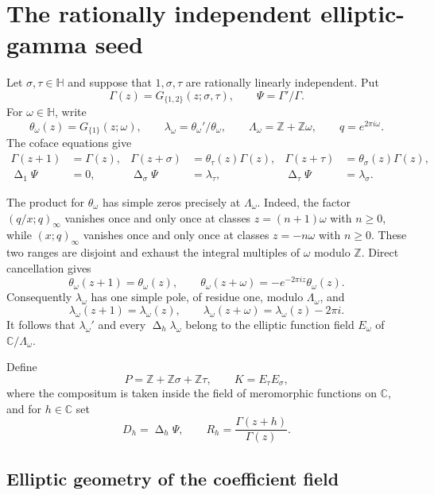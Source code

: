 \documentclass[11pt]{article}
\numberwithin{equation}{section}
\theoremstyle{definition}
\theoremstyle{remark}
\newcommand{\C}{\mathbb C}
\newcommand{\Z}{\mathbb Z}
\newcommand{\HH}{\mathbb H}
\newcommand{\Deltaop}{\mathop{\Delta}}
\begin{document}
\section{The rationally independent elliptic-gamma seed}
\label{sec:seed}

Let $\sigma,\tau\in\HH$ and suppose that $1,\sigma,\tau$ are rationally
linearly independent.  Put
\[
 \Gamma(z)=G_{\{1,2\}}(z;\sigma,\tau),
 \qquad \Psi=\Gamma'/\Gamma.
\]
For $\omega\in\HH$, write
\[
 \theta_\omega(z)=G_{\{1\}}(z;\omega),
 \qquad \lambda_\omega=\theta_\omega'/\theta_\omega,
 \qquad \Lambda_\omega=\Z+\Z\omega,
 \qquad q=e^{2\pi i\omega}.
\]
The coface equations give
\begin{align}
 \Gamma(z+1)&=\Gamma(z),
 &\Gamma(z+\sigma)&=\theta_\tau(z)\Gamma(z),
 &\Gamma(z+\tau)&=\theta_\sigma(z)\Gamma(z),
 \label{eq:Gamma-shifts}\\
 \Deltaop_1\Psi&=0,
 &\Deltaop_\sigma\Psi&=\lambda_\tau,
 &\Deltaop_\tau\Psi&=\lambda_\sigma.
 \label{eq:Psi-shifts}
\end{align}

The product for $\theta_\omega$ has simple zeros precisely at
$\Lambda_\omega$.  Indeed, the factor $(q/x;q)_\infty$ vanishes once and
only once at classes $z=(n+1)\omega$ with $n\geq0$, while
$(x;q)_\infty$ vanishes once and only once at classes $z=-n\omega$ with
$n\geq0$.  These two ranges are disjoint and exhaust the integral multiples
of $\omega$ modulo $\Z$.  Direct cancellation gives
\[
 \theta_\omega(z+1)=\theta_\omega(z),
 \qquad
 \theta_\omega(z+\omega)=-e^{-2\pi iz}\theta_\omega(z).
\]
Consequently $\lambda_\omega$ has one simple pole, of residue one, modulo
$\Lambda_\omega$, and
\begin{equation}
 \lambda_\omega(z+1)=\lambda_\omega(z),\qquad
 \lambda_\omega(z+\omega)=\lambda_\omega(z)-2\pi i.
 \label{eq:lambda-quasi}
\end{equation}
It follows that $\lambda_\omega'$ and every
$\Deltaop_h\lambda_\omega$ belong to the elliptic function field
$E_\omega$ of $\C/\Lambda_\omega$.

Define
\[
 P=\Z+\Z\sigma+\Z\tau,\qquad K=E_\tau E_\sigma,
\]
where the compositum is taken inside the field of meromorphic functions on
$\C$, and for $h\in\C$ set
\begin{equation}
 D_h=\Deltaop_h\Psi,\qquad
 R_h=\frac{\Gamma(z+h)}{\Gamma(z)}.
 \label{eq:defects}
\end{equation}

\subsection{Elliptic geometry of the coefficient field}
\end{document}
